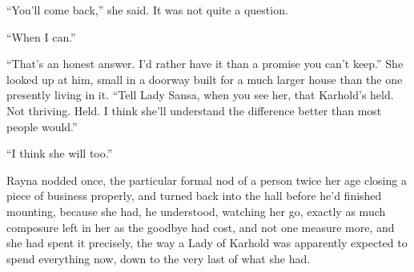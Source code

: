 “You’ll come back,” she said. It was not quite a question.

“When I can.”

“That’s an honest answer. I’d rather have it than a promise you can’t keep.” She looked up at him, small in a doorway built for a much larger house than the one presently living in it. “Tell Lady Sansa, when you see her, that Karhold’s held. Not thriving. Held. I think she’ll understand the difference better than most people would.”

“I think she will too.”

Rayna nodded once, the particular formal nod of a person twice her age closing a piece of business properly, and turned back into the hall before he’d finished mounting, because she had, he understood, watching her go, exactly as much composure left in her as the goodbye had cost, and not one measure more, and she had spent it precisely, the way a Lady of Karhold was apparently expected to spend everything now, down to the very last of what she had.